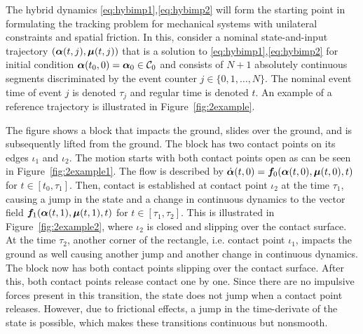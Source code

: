 \documentclass[../DC2019003Bouma.tex]{subfiles}
\begin{document}
The hybrid dynamics \eqref{eq:hybimp1},\eqref{eq:hybimp2} will form the starting point in formulating the tracking problem for mechanical systems with unilateral constraints and spatial friction. In this, consider a nominal state-and-input trajectory $(\boldsymbol{\alpha}(t,j),\boldsymbol{\mu}(t,j))$ that is a solution to \eqref{eq:hybimp1},\eqref{eq:hybimp2} for initial condition $\boldsymbol{\alpha}(t_0,0) = \boldsymbol{\alpha}_0\in \mathcal{C}_0$ and consists of $N+1$ absolutely continuous segments discriminated by the event counter $j\in\{0,1,\dots,N\}$. The nominal event time of event $j$ is denoted $\tau_j$ and regular time is denoted $t$. An example of a reference trajectory is illustrated in Figure~\ref{fig:2example}.

The figure shows a block that impacts the ground, slides over the ground, and is subsequently lifted from the ground. The block has two contact points on its edges $\iota_1$ and $\iota_2$. The motion starts with both contact points open as can be seen in Figure~\ref{fig:2example1}. The flow is described by $\dot{\boldsymbol{\alpha}}(t,0) = {\boldsymbol{f}}_0(\boldsymbol{\alpha}(t,0),\boldsymbol{\mu}(t,0),t)$ for $t\in[t_0,\tau_1]$. Then, contact is established at contact point $\iota_2$ at the time $\tau_1$, causing a jump in the state and a change in continuous dynamics to the vector field ${\boldsymbol{f}}_1(\boldsymbol{\alpha}(t,1),\boldsymbol{\mu}(t,1),t)$ for $t\in[\tau_1,\tau_2]$. This is illustrated in Figure~\ref{fig:2example2}, where $\iota_2$ is closed and slipping over the contact surface. At the time $\tau_2$, another corner of the rectangle, i.e. contact point $\iota_1$, impacts the ground as well causing another jump and another change in continuous dynamics. The block now has both contact points slipping over the contact surface. After this, both contact points release contact one by one. Since there are no impulsive forces present in this transition, the state does not jump when a contact point releases. However, due to frictional effects, a jump in the time-derivate of the state is possible, which makes these transitions continuous but nonsmooth.
\end{document}
